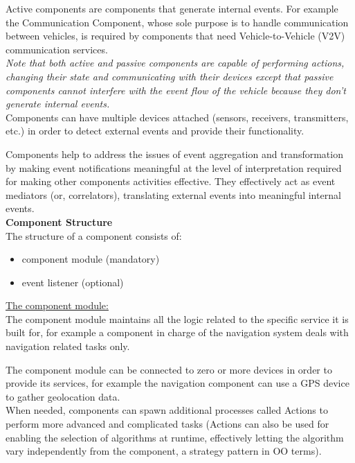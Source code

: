 \documentclass{memoir}
\begin{document}
Active components are components that generate internal events. For example the Communication Component, whose sole purpose is to handle communication between vehicles, is required by components that need Vehicle-to-Vehicle (V2V) communication services.
\\

\textit{Note that both active and passive components are capable of performing actions, changing their state and communicating with their devices except that passive components cannot interfere with the event flow of the vehicle because they don't generate internal events.}
\\

Components can have multiple devices attached (sensors, receivers, transmitters, etc.) in order to detect external events and provide their functionality.

Components help to address the issues of event aggregation and transformation by making event notifications meaningful at the level of interpretation required for making other components activities effective. They effectively act as event mediators (or, correlators), translating external events into meaningful internal events.
\\
\newline
\textbf{Component Structure}
\\
\newline
The structure of a component consists of: 
\begin{itemize}
	\item component module (mandatory)
	\item event listener (optional)
\end{itemize}

\underline{The component module:}
\\
The component module maintains all the logic related to the specific service it is built for, for example a component in charge of the navigation system deals with navigation related tasks only.

The component module can be connected to zero or more devices in order to provide its services, for example the navigation component can use a GPS device to gather geolocation data. 
\\

When needed, components can spawn additional processes called Actions to perform more advanced and complicated tasks (Actions can also be used for enabling the selection of algorithms at runtime, effectively letting the algorithm vary independently from the component, a strategy pattern in OO terms).
\end{document}
